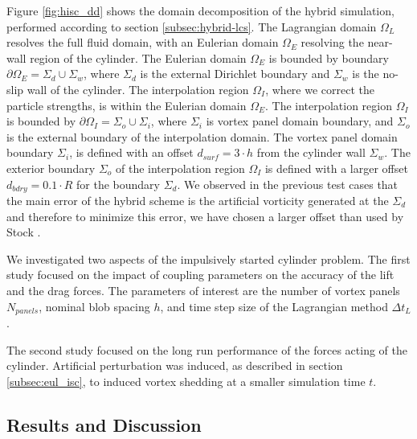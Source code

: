 Figure \ref{fig:hisc_dd} shows the domain decomposition of the hybrid simulation, performed according to section \ref{subsec:hybrid-lcs}. The Lagrangian domain $\Omega_L$ resolves the full fluid domain, with an Eulerian domain $\Omega_E$ resolving the near-wall region of the cylinder. The Eulerian domain $\Omega_E$ is bounded by boundary $\partial\Omega_E=\Sigma_d\cup\Sigma_{w}$, where $\Sigma_d$ is the external Dirichlet boundary and $\Sigma_{w}$ is the no-slip wall of the cylinder. The interpolation region $\Omega_{I}$, where we correct the particle strengths, is within the Eulerian domain $\Omega_E$. The interpolation region $\Omega_{I}$ is bounded by $\partial\Omega_{I}=\Sigma_o\cup\Sigma_{i}$, where $\Sigma_i$ is  vortex panel domain boundary, and $\Sigma_{o}$ is the external boundary of the interpolation domain. The vortex panel domain boundary $\Sigma_i$, is defined with an offset $d_{surf}=3\cdot{h}$ from the cylinder wall $\Sigma_{w}$. The exterior boundary $\Sigma_{o}$ of the interpolation region $\Omega_{I}$ is defined with a larger offset $d_{bdry} = 0.1\cdot{R}$ for the boundary $\Sigma_d$. We observed in the previous test cases that the main error of the hybrid scheme is the artificial vorticity generated at the $\Sigma_d$ and therefore to minimize this error, we have chosen a larger offset than used by Stock \cite{Stock2010a}.


We investigated two aspects of the impulsively started cylinder problem. The first study focused on the impact of coupling parameters on the accuracy of the lift and the drag forces. The parameters of interest are the number of vortex panels $N_{panels}$, nominal blob spacing $h$, and time step size of the Lagrangian method $\Delta t_L$.

The second study focused on the long run performance of the forces acting of the cylinder. Artificial perturbation was induced, as described in section \ref{subsec:eul_isc}, to induced vortex shedding at a smaller simulation time $t$.

\subsection{Results and Discussion}

